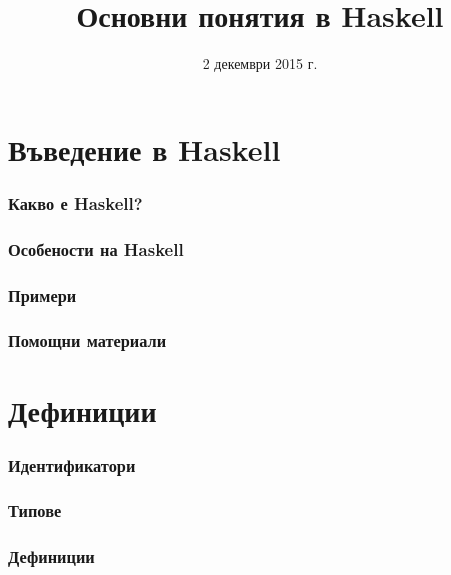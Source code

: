 \documentclass{beamer}
\title{Основни понятия в Haskell}
\date{2 декември 2015 г.}
\begin{document}
\begin{frame}
  \titlepage
\end{frame}

\section{Въведение в Haskell}

\begin{frame}
  \frametitle{Какво е Haskell?}
  
\end{frame}

\begin{frame}
  \frametitle{Особености на Haskell}
  
\end{frame}

\begin{frame}
  \frametitle{Примери}
  
\end{frame}

\begin{frame}
  \frametitle{Помощни материали}
  
\end{frame}

\section{Дефиниции}

\begin{frame}
  \frametitle{Идентификатори}
  
\end{frame}

\begin{frame}
  \frametitle{Типове}
  
\end{frame}

\begin{frame}
  \frametitle{Дефиниции}

\end{frame}
\end{document}
